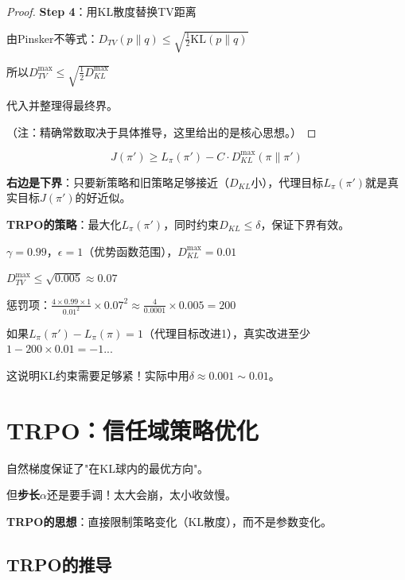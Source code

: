\documentclass[11pt,a4paper]{article}
\theoremstyle{definition}
\begin{document}
\begin{proof}
\textbf{Step 4}：用KL散度替换TV距离

由Pinsker不等式：$D_{TV}(p \| q) \leq \sqrt{\frac{1}{2}\text{KL}(p \| q)}$

所以$D_{TV}^{\max} \leq \sqrt{\frac{1}{2}D_{KL}^{\max}}$

代入并整理得最终界。

（注：精确常数取决于具体推导，这里给出的是核心思想。）
\end{proof}

\begin{keypoint}[界的意义]
\[
J(\pi') \geq L_\pi(\pi') - C \cdot D_{KL}^{\max}(\pi \| \pi')
\]

\textbf{右边是下界}：只要新策略和旧策略足够接近（$D_{KL}$小），代理目标$L_\pi(\pi')$就是真实目标$J(\pi')$的好近似。

\textbf{TRPO的策略}：最大化$L_\pi(\pi')$，同时约束$D_{KL} \leq \delta$，保证下界有效。
\end{keypoint}

\begin{calculation}[界的数值感受]
$\gamma = 0.99$，$\epsilon = 1$（优势函数范围），$D_{KL}^{\max} = 0.01$

$D_{TV}^{\max} \leq \sqrt{0.005} \approx 0.07$

惩罚项：$\frac{4 \times 0.99 \times 1}{0.01^2} \times 0.07^2 \approx \frac{4}{0.0001} \times 0.005 = 200$

如果$L_\pi(\pi') - L_\pi(\pi) = 1$（代理目标改进1），真实改进至少$1 - 200 \times 0.01 = -1$...

这说明KL约束需要足够紧！实际中用$\delta \approx 0.001 \sim 0.01$。
\end{calculation}

\section{TRPO：信任域策略优化}

\begin{plainwords}[自然梯度的问题]
自然梯度保证了"在KL球内的最优方向"。

但\textbf{步长}$\alpha$还是要手调！太大会崩，太小收敛慢。

\textbf{TRPO的思想}：直接限制策略变化（KL散度），而不是参数变化。
\end{plainwords}

\subsection{TRPO的推导}
\end{document}
